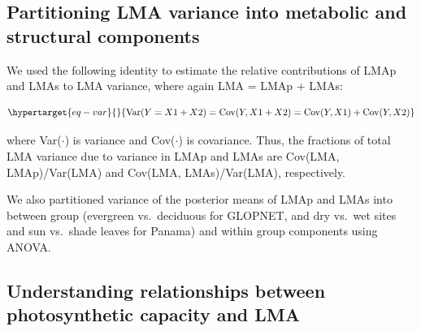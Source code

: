 \documentclass[
  12pt,
  a4paper,
,tablecaptionabove
]{scrartcl}
\begin{document}
\hypertarget{partitioning-lma-variance-into-metabolic-and-structural-components}{%
\subsection{Partitioning LMA variance into metabolic and structural
components}\label{partitioning-lma-variance-into-metabolic-and-structural-components}}

We used the following identity to estimate the relative contributions of
LMAp and LMAs to LMA variance, where again LMA = LMAp + LMAs:

\begin{equation}\protect\hypertarget{eq-var}{}{
\mathrm{Var}(Y = X1 + X2) = \mathrm{Cov}(Y, X1+X2) = \mathrm{Cov}(Y,X1) + \mathrm{Cov}(Y,X2)
}\label{eq-var}\end{equation}

where Var(\(\cdot\)) is variance and Cov(\(\cdot\)) is covariance. Thus,
the fractions of total LMA variance due to variance in LMAp and LMAs are
Cov(LMA, LMAp)/Var(LMA) and Cov(LMA, LMAs)/Var(LMA), respectively.

We also partitioned variance of the posterior means of LMAp and LMAs
into between group (evergreen vs.~deciduous for GLOPNET, and dry vs.~wet
sites and sun vs.~shade leaves for Panama) and within group components
using ANOVA.

\hypertarget{understanding-relationships-between-photosynthetic-capacity-and-lma}{%
\subsection{Understanding relationships between photosynthetic capacity
and
LMA}\label{understanding-relationships-between-photosynthetic-capacity-and-lma}}
\end{document}
